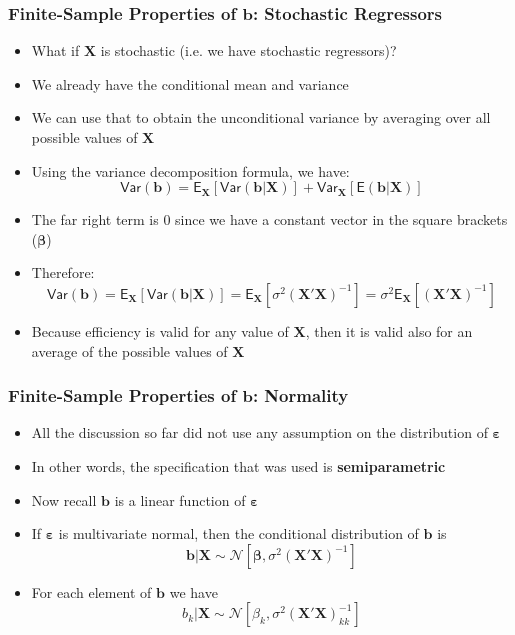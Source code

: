 \documentclass[10pt]{beamer}
\newcommand{\var}{\mathsf{Var}}
\theoremstyle{definition}
\begin{document}
\begin{frame}[fragile]
\frametitle{Finite-Sample Properties of $\mathbf{b}$: Stochastic Regressors}
\begin{itemize}
	\item What if $\mathbf{X}$ is stochastic (i.e. we have stochastic regressors)?
	\item We already have the conditional mean and variance
	\item We can use that to obtain the unconditional variance by averaging over all possible values of $\mathbf{X}$
	\item Using the variance decomposition formula, we have:
	\[
		\var(\mathbf{b}) = \mathsf{E}_{\mathbf{X}}[\var(\mathbf{b|X})] + \var_{\mathbf{X}}[\mathsf{E}(\mathbf{b|X})]
	\]
	\item The far right term is 0 since we have a constant vector in the square brackets ($\bm\beta$)
	\item Therefore:
	\[
		\var(\mathbf{b}) = \mathsf{E}_{\mathbf{X}}[\var(\mathbf{b|X})] = \mathsf{E}_{\mathbf{X}}[\sigma^{2}(\mathbf{X'X})^{-1}] = \sigma^{2}\mathsf{E}_{\mathbf{X}}[(\mathbf{X'X})^{-1}]
	\]
	\item Because efficiency is valid for any value of $\mathbf{X}$, then it is valid also for an average of the possible values of $\mathbf{X}$
\end{itemize}
\end{frame}

\begin{frame}[fragile]
	\frametitle{Finite-Sample Properties of $\mathbf{b}$: Normality}
	\begin{itemize}
		\item All the discussion so far did not use any assumption on the distribution of $ \boldsymbol\varepsilon $
		\item In other words, the specification that was used is \textbf{semiparametric}
		\item Now recall $ \mathbf{b} $ is a linear function of $ \boldsymbol\varepsilon $
		\item If $ \boldsymbol\varepsilon $ is multivariate normal, then the conditional distribution of $ \mathbf{b} $ is
		\[
		\mathbf{b|X} \sim \mathcal{N}[\boldsymbol\beta, \sigma^{2}\mathbf{(X'X)}^{-1}]
		\]
		\item For each element of $ \mathbf{b} $ we have
		\[
		b_{k}|\mathbf{X} \sim \mathcal{N}[\beta_{k}, \sigma^{2}\mathbf{(X'X)}_{kk}^{-1}]
		\]
	\end{itemize}	
\end{frame}
\end{document}
